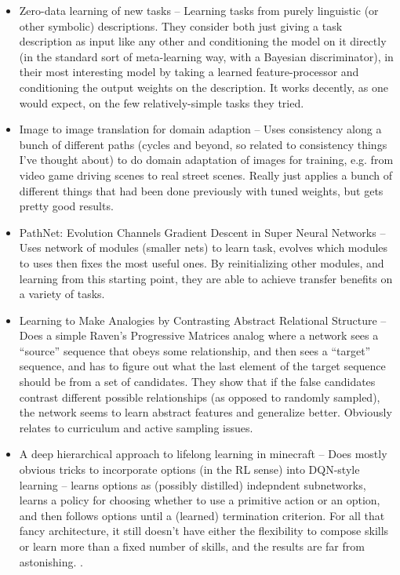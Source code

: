 \documentclass[11pt]{article}
\begin{document}
\begin{itemize}
\item Zero-data learning of new tasks -- Learning tasks from purely linguistic (or other symbolic) descriptions. They consider both just giving a task description as input like any other and conditioning the model on it directly (in the standard sort of meta-learning way, with a Bayesian discriminator), in their most interesting model by taking a learned feature-processor and conditioning the output weights on the description. It works decently, as one would expect, on the few relatively-simple tasks they tried. 
\item Image to image translation for domain adaption -- Uses consistency along a bunch of different paths (cycles and beyond, so related to consistency things I've thought about) to do domain adaptation of images for training, e.g. from video game driving scenes to real street scenes. Really just applies a bunch of different things that had been done previously with tuned weights, but gets pretty good results.
\item PathNet: Evolution Channels Gradient Descent in Super Neural Networks -- Uses network of modules (smaller nets) to learn task, evolves which modules to uses then fixes the most useful ones. By reinitializing other modules, and learning from this starting point, they are able to achieve transfer benefits on a variety of tasks. \citep{Fernando2017}
\item Learning to Make Analogies by Contrasting Abstract Relational Structure -- Does a simple Raven's Progressive Matrices analog where a network sees a ``source'' sequence that obeys some relationship, and then sees a ``target'' sequence, and has to figure out what the last element of the target sequence should be from a set of candidates. They show that if the false candidates contrast different possible relationships (as opposed to randomly sampled), the network seems to learn abstract features and generalize better. Obviously relates to curriculum and active sampling issues. \citep{Hill2019}
\item A deep hierarchical approach to lifelong learning in minecraft -- Does mostly obvious tricks to incorporate options (in the RL sense) into DQN-style learning -- learns options as (possibly distilled) indepndent subnetworks, learns a policy for choosing whether to use a primitive action or an option, and then follows options until a (learned) termination criterion. For all that fancy architecture, it still doesn't have either the flexibility to compose skills or learn more than a fixed number of skills, and the results are far from astonishing. \citep{Tessler2016}.

\end{itemize}
\end{document}
